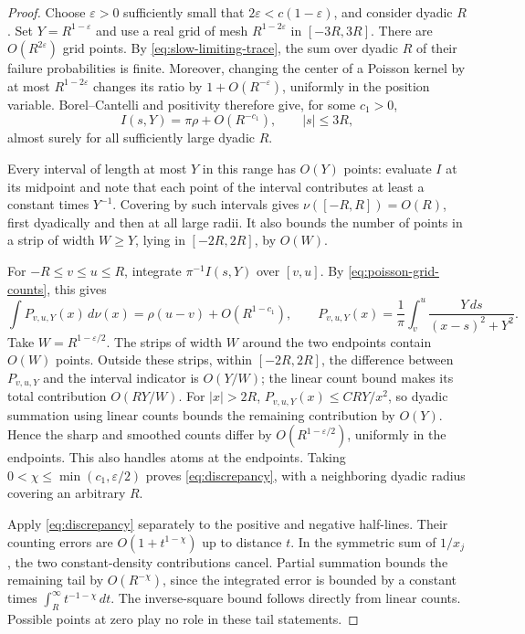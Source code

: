 \begin{proof}
Choose $\varepsilon>0$ sufficiently small that
$2\varepsilon<c(1-\varepsilon)$, and consider dyadic $R$.
Set $Y=R^{1-\varepsilon}$ and use a real grid of mesh
$R^{1-2\varepsilon}$ in $[-3R,3R]$. There are $O(R^{2\varepsilon})$
grid points. By \eqref{eq:slow-limiting-trace}, the sum over dyadic $R$
of their failure probabilities is finite. Moreover, changing the center
of a Poisson kernel by at most $R^{1-2\varepsilon}$ changes its ratio
by $1+O(R^{-\varepsilon})$, uniformly in the position variable.
Borel--Cantelli and positivity therefore give, for some $c_1>0$,
\begin{equation}\label{eq:poisson-grid-counts}
 I(s,Y)=\pi\rho+O(R^{-c_1}),\qquad |s|\le3R,
\end{equation}
almost surely for all sufficiently large dyadic $R$.

Every interval of length at most $Y$ in this range has $O(Y)$ points:
evaluate $I$ at its midpoint and note that each point of the interval
contributes at least a constant times $Y^{-1}$. Covering by such
intervals gives $\nu([-R,R])=O(R)$, first dyadically and then at all
large radii. It also bounds the number of points in a strip of width
$W\ge Y$, lying in $[-2R,2R]$, by $O(W)$.

For $-R\le v\le u\le R$, integrate
$\pi^{-1}I(s,Y)$ over $[v,u]$. By
\eqref{eq:poisson-grid-counts}, this gives
\[
 \int P_{v,u,Y}(x)\,d\nu(x)
     =\rho(u-v)+O(R^{1-c_1}),\qquad
 P_{v,u,Y}(x)=\frac1\pi\int_v^u
                       \frac{Y\,ds}{(x-s)^2+Y^2}.
\]
Take $W=R^{1-\varepsilon/2}$. The strips of width $W$ around the
two endpoints contain $O(W)$ points. Outside these strips, within
$[-2R,2R]$, the difference between $P_{v,u,Y}$ and the interval
indicator is $O(Y/W)$; the linear count bound makes its total
contribution $O(RY/W)$. For $|x|>2R$,
$P_{v,u,Y}(x)\le CRY/x^2$, so dyadic summation using linear counts
bounds the remaining contribution by $O(Y)$. Hence the sharp and
smoothed counts differ by $O(R^{1-\varepsilon/2})$, uniformly in
the endpoints. This also handles atoms at the endpoints. Taking
$0<\chi\le\min(c_1,\varepsilon/2)$ proves
\eqref{eq:discrepancy}, with a neighboring dyadic radius covering an
arbitrary $R$.

Apply \eqref{eq:discrepancy} separately to the positive and negative
half-lines. Their counting errors are $O(1+t^{1-\chi})$ up to distance
$t$. In the symmetric sum of $1/x_j$, the two constant-density
contributions cancel. Partial summation bounds the remaining tail by
$O(R^{-\chi})$, since the integrated error is bounded by a constant
times $\int_R^\infty t^{-1-\chi}\,dt$. The inverse-square bound follows
directly from linear counts. Possible points at zero play no role in
these tail statements.
\end{proof}

